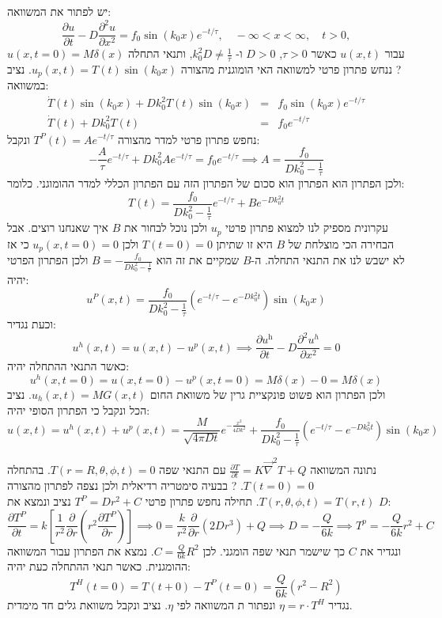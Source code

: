 \documentclass{tstextbook}
\begin{document}
יש לפתור את המשוואה:
$$ \frac{\partial u}{\partial t}-D\frac{\partial^{2}u}{\partial x^{2}}=f_{0}\sin\left(k_{0}x\right)e^{-t/\tau},\quad-\infty<x<\infty,\quad t>0,$$
עבור \(u(x,t)\) כאשר \(\tau>0\), \(D>0\) ו- \(k_{0}^2D\neq \frac{1}{\tau}\), ותנאי התחלה \(u(x,t=0)=M\delta(x)\)
?
ננחש פתרון פרטי למשוואה האי הומוגנית מהצורה \(u_{p}(x,t)=T(t)\sin(k_{0}x)\). נציב במשוואה:
$$ \begin{array}{rcl}\dot{T}\left(t\right)\sin\left(k_0x\right)+Dk_0^2T\left(t\right)\sin\left(k_0x\right)&=&f_0\sin\left(k_0x\right)e^{-t/\tau}\\\dot{T}\left(t\right)+Dk_0^2T\left(t\right)&=&f_0e^{-t/\tau}\end{array}$$
נחפש פתרון פרטי למדר מהצורה \(T^P(t)=Ae^{-t/\tau}\) ונקבל:
$$ -\frac{A}{\tau}e^{-t/\tau}+Dk_{0}^{2}Ae^{-t/\tau}=f_{0}e^{-t/\tau}\implies A=\frac{f_{0}}{Dk_{0}^{2}-\frac{1}{\tau}}$$
ולכן הפתרון הוא הפתרון הוא סכום של הפתרון הזה עם הפתרון הכללי למדר ההומוגני. כלומר:
$$ T\left(t\right)=\frac{f_{0}}{Dk_{0}^{2}-\frac{1}{\tau}}e^{-t/\tau}+Be^{-Dk_{0}^{2}t}$$
עקרונית מספיק לנו למצוא פתרון פרטי \(u_{p}\) ולכן נוכל לבחור את \(B\) איך שאנחנו רוצים. אבל הבחירה הכי מוצלחת של \(B\) היא זו שתיתן \(T(t=0)=0\) ולכן \(u_{p}(x,t=0)=0\) כי אז לא ישבש לנו את התנאי התחלה. ה-\(B\) שמקיים את זה הוא \(B=-\frac{f_0}{Dk_0^2-\frac{1}{r}}\)
ולכן הפתרון הפרטי יהיה:
$$ u^{P}\left(x,t\right)=\frac{f_{0}}{Dk_{0}^{2}-\frac{1}{\tau}}\left(e^{-t/\tau}-e^{-Dk_{0}^{2}t}\right)\sin\left(k_{0}x\right)$$
וכעת נגדיר:
$$ u^{h}\left(x,t\right)=u\left(x,t\right)-u^{p}\left(x,t\right)\implies\frac{\partial u^\mathrm{h}}{\partial t}-D\frac{\partial^2u^h}{\partial x^2}=0$$
כאשר התנאי ההתחלה יהיה:
$$ u^h\left(x,t=0\right)=u\left(x,t=0\right)-u^p\left(x,t=0\right)=M\delta\left(x\right)-0=M\delta\left(x\right)$$
ולכן הפתרון הוא פשוט פונקציית גרין של משוואת החום \(u_{h}(x,t)=MG(x,t)\). נציב הכל ונקבל כי הפתרון הסופי יהיה:
$$ u\left(x,t\right)=u^{h}\left(x,t\right)+u^{p}\left(x,t\right)=\frac{M}{\sqrt{4\pi Dt}}e^{-\frac{x^{2}}{4Dk^2}}+\frac{f_{0}}{Dk_{0}^{2}-\frac{1}{\tau}}\left(e^{-t/\tau}-e^{-Dk_{0}^{2}t}\right)\sin\left(k_{0}x\right)$$

נתונה המשוואה \(\frac{\partial T}{\partial t}=K\vec{\nabla} ^2T+Q\)  עם התנאי שפה \(T\left( r=R,\theta,\phi,t \right)=0\). בהתחלה \(T(t=0)=0\). 
?
בבעיה סימטריה רדיאלית ולכן נצפה לפתרון מהצורה \(T\left( r,\theta,\phi,t \right)=T(r,t)\).
תחילה נחפש פתרון פרטי \(T^P=Dr^2+C\) נציב ונמצא את \(D\):
$$\frac{\partial T^P}{\partial t}\!=\!k\left[ \frac{1}{r^2}\frac{\partial }{\partial r}\left( r^2\frac{\partial T^P}{\partial r} \right) \right]\!\!\!\implies \!\!0=\frac{k}{r^2}\frac{\partial }{\partial r}(2Dr^3)+Q\!\!\implies\!\! D=-\frac{Q}{6k}\!\!\implies \!\!T^p=-\frac{Q}{6k}r^2+C$$
ונגדיר את \(C\) כך שישמר תנאי שפה הומגני. לכן \(C=\frac{Q}{6k}R^2\). נמצא את הפתרון עבור המשוואה ההומגנית. כאשר תנאי ההתחלה כעת יהיה:
$$ T^{H}(t=0)=T(t+0)-T^{P}(t=0)=\frac{Q}{6k}(r^{2}-R^{2})$$
נגדיר \(\eta=r\cdot T^H\) ונפתור ת המשוואה לפי \(\eta\). נציב ונקבל משוואת גלים חד מימדית.
\end{document}
